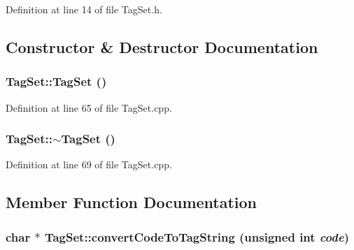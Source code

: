 Definition at line 14 of file TagSet.h.

\subsection{Constructor \& Destructor Documentation}
\hypertarget{classkmaOrange_1_1TagSet_630d96e4b22bf3692dc0276b0b19ebbf}{
\subsubsection[{TagSet}]{\setlength{\rightskip}{0pt plus 5cm}TagSet::TagSet ()}}
\label{classkmaOrange_1_1TagSet_630d96e4b22bf3692dc0276b0b19ebbf}




Definition at line 65 of file TagSet.cpp.\hypertarget{classkmaOrange_1_1TagSet_ac463802c81bbc7465c54768398d373d}{
\subsubsection[{$\sim$TagSet}]{\setlength{\rightskip}{0pt plus 5cm}TagSet::$\sim$TagSet ()}}
\label{classkmaOrange_1_1TagSet_ac463802c81bbc7465c54768398d373d}




Definition at line 69 of file TagSet.cpp.

\subsection{Member Function Documentation}
\hypertarget{classkmaOrange_1_1TagSet_e3618e2fef4cb6394b18aad656231449}{
\subsubsection[{convertCodeToTagString}]{\setlength{\rightskip}{0pt plus 5cm}char $\ast$ TagSet::convertCodeToTagString (unsigned int {\em code})}}
\label{classkmaOrange_1_1TagSet_e3618e2fef4cb6394b18aad656231449}




